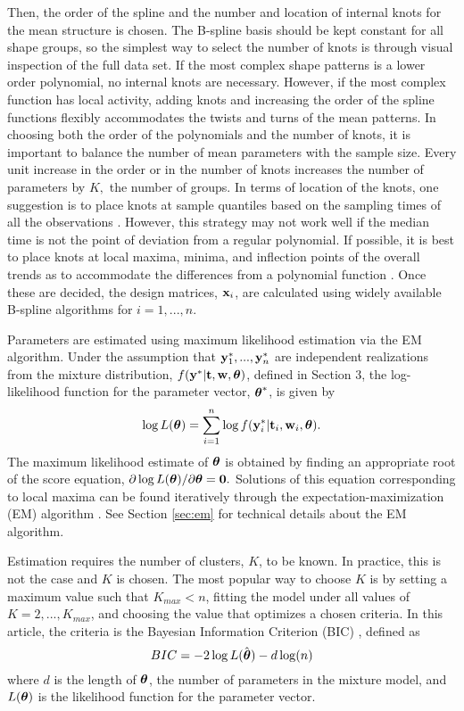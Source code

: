 Then, the order of the spline and the number and location of internal knots for the mean structure is chosen. The B-spline basis should be kept constant for all shape groups, so the simplest way to select the number of knots is through visual inspection of the full data set. If the most complex shape patterns is a lower order polynomial, no internal knots are necessary. However, if the most complex function has local activity, adding knots and increasing the order of the spline functions flexibly accommodates the twists and turns of the mean patterns. In choosing both the order of the polynomials and the number of knots, it is important to balance the number of mean parameters with the sample size. Every unit increase in the order or in the number of knots increases the number of parameters by $K,$ the number of groups. In terms of location of the knots, one suggestion is to place knots at sample quantiles based on the sampling times of all the observations \cite{ruppert2002}. However, this strategy may not work well if the median time is not the point of deviation from a regular polynomial. If possible, it is best to place knots at local maxima, minima, and inflection points of the overall trends as to accommodate the differences from a polynomial function \cite{eubank1999}.  Once these are decided, the design matrices, $\mathbf x_{i}$, are calculated using widely available B-spline algorithms for $i=1,...,n$. 


Parameters are estimated using maximum likelihood estimation via the EM algorithm. Under the assumption that $\mathbf y^{*}_{1},...,\mathbf y^{*}_{n}$ are independent realizations from the mixture distribution, $f(\mathbf y^{*} | \mathbf t, \mathbf w, \boldsymbol\theta)$, defined in Section 3, the log-likelihood function for the parameter vector, $\boldsymbol \theta^{*}$, is given by
$$\log L(\boldsymbol\theta)=\sum^{n}_{i=1}\log f(\mathbf y^{*}_{i}|\mathbf t_{i},\mathbf w_{i},\boldsymbol \theta).$$
The maximum likelihood estimate of $\boldsymbol\theta$ is obtained by finding an appropriate root of the score equation, $\partial \log L(\boldsymbol\theta)/\partial \boldsymbol\theta=\mathbf 0.$ Solutions of this equation corresponding to local maxima can be found iteratively through the expectation-maximization (EM) algorithm \cite{dempster1977}. See Section \ref{sec:em} for technical details about the EM algorithm.

Estimation requires the number of clusters, $K$, to be known. In practice, this is not the case and $K$ is chosen. The most popular way to choose $K$ is by setting a maximum value such that $K_{max}<n$, fitting the model under all values of $K=2,...,K_{max}$, and choosing the value that optimizes a chosen criteria. In this article, the criteria is the Bayesian Information Criterion (BIC) \cite{schwarz1978}, defined as
$$BIC = -2\log L(\hat{\boldsymbol\theta})- d\log(n)$$
where $d$ is the length of $\boldsymbol\theta$, the number of parameters in the mixture model, and $L(\boldsymbol\theta)$ is the likelihood function for the parameter vector.

